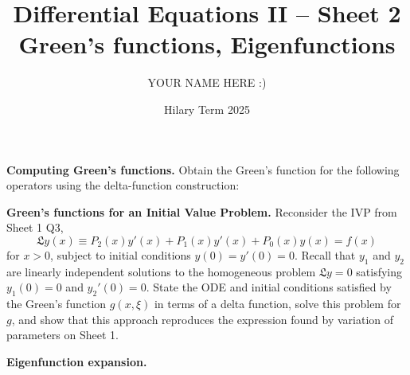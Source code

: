\documentclass[answers]{exam}
\title{Differential Equations II -- Sheet 2\\Green's functions, Eigenfunctions}
\author{YOUR NAME HERE :)}
\date{Hilary Term 2025}
\begin{document}
\maketitle
\begin{questions}

\question%
\textbf{Computing Green's functions.} Obtain the Green's function for the following operators using the delta-function construction:



\question%
\textbf{Green's functions for an Initial Value Problem.} Reconsider the IVP from Sheet 1 Q3, \[
	\mathfrak{L} y(x) \equiv P_{2}(x) y'(x)+P_{1}(x) y'(x)+P_{0}(x) y(x)=f(x)
\] for $x>0$, subject to initial conditions $y(0)=y'(0)=0$. Recall that $y_{1}$ and $y_{2}$ are linearly independent solutions to the homogeneous problem $\mathfrak{L} y=0$ satisfying $y_{1}(0)=0$ and $y_{2}'(0)=0$. State the ODE and initial conditions satisfied by the Green's function $g(x, \xi)$ in terms of a delta function, solve this problem for $g$, and show that this approach reproduces the expression found by variation of parameters on Sheet 1.



\question%
\textbf{Eigenfunction expansion.}
\end{questions}
\end{document}
